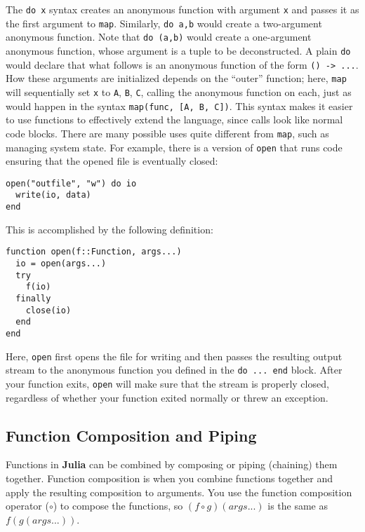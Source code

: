 \documentclass[
]{article}
\begin{document}
The \texttt{do\ x} syntax creates an anonymous function with argument
\texttt{x} and passes it as the first argument to \texttt{map}.
Similarly, \texttt{do\ a,b} would create a two-argument anonymous
function. Note that \texttt{do\ (a,b)} would create a one-argument
anonymous function, whose argument is a tuple to be deconstructed. A
plain \texttt{do} would declare that what follows is an anonymous
function of the form \texttt{()\ -\textgreater{}\ ...}. How these
arguments are initialized depends on the ``outer'' function; here,
\texttt{map} will sequentially set \texttt{x} to \texttt{A}, \texttt{B},
\texttt{C}, calling the anonymous function on each, just as would happen
in the syntax \texttt{map(func,\ {[}A,\ B,\ C{]})}. This syntax makes it
easier to use functions to effectively extend the language, since calls
look like normal code blocks. There are many possible uses quite
different from \texttt{map}, such as managing system state. For example,
there is a version of \texttt{open} that runs code ensuring that the
opened file is eventually closed:

\begin{verbatim}
open("outfile", "w") do io
  write(io, data)
end
\end{verbatim}

This is accomplished by the following definition:

\begin{verbatim}
function open(f::Function, args...)
  io = open(args...)
  try
    f(io)
  finally
    close(io)
  end
end
\end{verbatim}

Here, \texttt{open} first opens the file for writing and then passes the
resulting output stream to the anonymous function you defined in the
\texttt{do\ ...\ end} block. After your function exits, \texttt{open}
will make sure that the stream is properly closed, regardless of whether
your function exited normally or threw an exception.

\hypertarget{function-composition-and-piping}{%
\subsection{Function Composition and
Piping}\label{function-composition-and-piping}}

Functions in \textbf{Julia} can be combined by composing or piping
(chaining) them together. Function composition is when you combine
functions together and apply the resulting composition to arguments. You
use the function composition operator (\(\circ\)) to compose the
functions, so \((f\circ g)(args...)\) is the same as \(f(g(args...))\).
\end{document}
